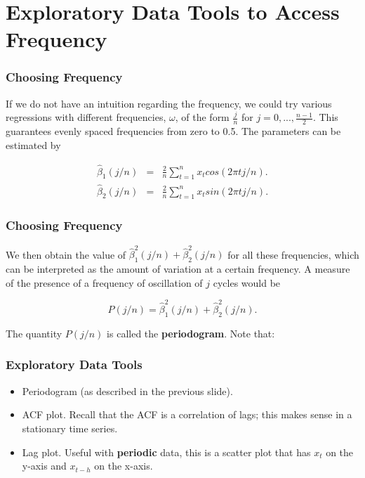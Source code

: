 \documentclass[%
xcolor=pdftex]{beamer}
\begin{document}
\section{Exploratory Data Tools to Access Frequency}
\frame{\tableofcontents[currentsection]}

\begin{frame}
\frametitle{Choosing Frequency}

If we do not have an intuition regarding the frequency, we could try various regressions with different frequencies, $\omega$, of the form $\frac{j}{n}$ for $j=0,...,\frac{n-1}{2}$.  This guarantees evenly spaced frequencies from zero to 0.5. The parameters can be estimated by

\begin{eqnarray*}
\hat{\beta}_1(j/n) &=& \frac{2}{n} \sum_{t=1}^n x_t cos( 2 \pi t j/n ).\\
\hat{\beta}_2(j/n) &=& \frac{2}{n} \sum_{t=1}^n x_t sin( 2 \pi t j/n  ).
\end{eqnarray*}

\end{frame}

\begin{frame}
\frametitle{Choosing Frequency}

We then obtain the value of $\hat{\beta}_1^2(j/n)+\hat{\beta}_2^2(j/n)$ for all these frequencies, which can be interpreted as the amount of variation at a certain frequency. A measure of the presence of a frequency of oscillation of $j$ cycles would be

\begin{equation*}
P(j/n) = \hat{\beta}^2_1(j/n) + \hat{\beta}^2_2(j/n).
\end{equation*}

The quantity $P(j/n)$ is called the \textbf{periodogram}. Note that:

\vspace{30mm}

\end{frame}

\begin{frame}
\frametitle{Exploratory Data Tools}

\begin{itemize}
\item Periodogram (as described in the previous slide).
\item ACF plot. Recall that the ACF is a correlation of lags; this makes sense in a stationary time series.
\item Lag plot. Useful with \textbf{periodic} data, this is a scatter plot that has $x_t$ on the y-axis and $x_{t-h}$ on the x-axis.
\end{itemize}

\end{frame}
\end{document}
